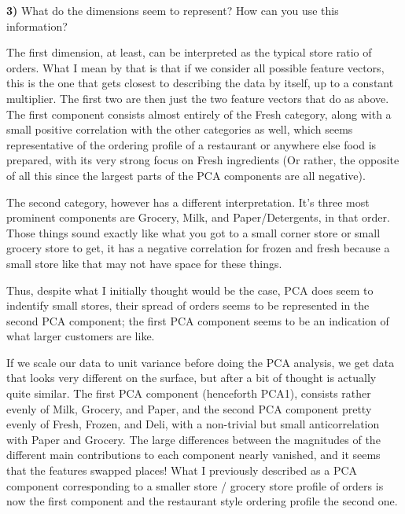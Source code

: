 \documentclass{article}
\begin{document}
    \textbf{3)} What do the dimensions seem to represent? How can you use
this information?

    The first dimension, at least, can be interpreted as the typical store
ratio of orders. What I mean by that is that if we consider all possible
feature vectors, this is the one that gets closest to describing the
data by itself, up to a constant multiplier. The first two are then just
the two feature vectors that do as above. The first component consists
almost entirely of the Fresh category, along with a small positive
correlation with the other categories as well, which seems
representative of the ordering profile of a restaurant or anywhere else
food is prepared, with its very strong focus on Fresh ingredients (Or
rather, the opposite of all this since the largest parts of the PCA
components are all negative).

The second category, however has a different interpretation. It's three
most prominent components are Grocery, Milk, and Paper/Detergents, in
that order. Those things sound exactly like what you got to a small
corner store or small grocery store to get, it has a negative
correlation for frozen and fresh because a small store like that may not
have space for these things.

Thus, despite what I initially thought would be the case, PCA does seem
to indentify small stores, their spread of orders seems to be
represented in the second PCA component; the first PCA component seems
to be an indication of what larger customers are like.

If we scale our data to unit variance before doing the PCA analysis, we
get data that looks very different on the surface, but after a bit of
thought is actually quite similar. The first PCA component (henceforth
PCA1), consists rather evenly of Milk, Grocery, and Paper, and the
second PCA component pretty evenly of Fresh, Frozen, and Deli, with a
non-trivial but small anticorrelation with Paper and Grocery. The large
differences between the magnitudes of the different main contributions
to each component nearly vanished, and it seems that the features
swapped places! What I previously described as a PCA component
corresponding to a smaller store / grocery store profile of orders is
now the first component and the restaurant style ordering profile the
second one.
\end{document}
